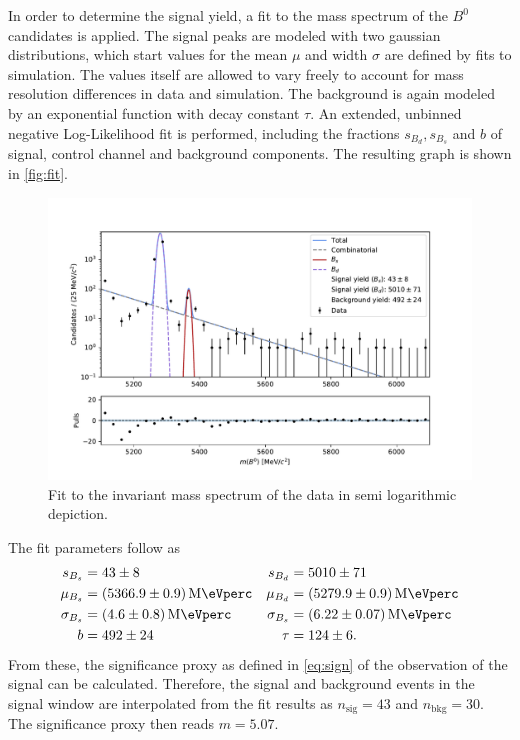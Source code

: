 In order to determine the signal yield, a fit to the mass spectrum of the $B^0$ candidates is applied. 
The signal peaks are modeled with two gaussian distributions, which start values for the mean $\mu$ and width $\sigma$ are defined by fits to simulation. The values itself 
are allowed to vary freely to account for mass resolution differences in data and simulation. 
The background is again modeled by an exponential function with decay constant $\tau$.
An extended, unbinned negative Log-Likelihood fit is performed, including the fractions $s_{B_d}, s_{B_s}$ and $b$ of signal, control channel and background components.
The resulting graph is shown in \autoref{fig:fit}.
\begin{figure}
  \centering
  \includegraphics[width = .9\textwidth]{"content/plots/final_fit.pdf"}
  \caption{Fit to the invariant mass spectrum of the data in semi logarithmic depiction.}
  \label{fig:fit}
\end{figure}
The fit parameters follow as 
\begin{align*}
  s_{B_s} &= \num{43 +- 8} & s_{B_d} &= \num{5010 +- 71} \\
  \mu_{B_s} &= \qty{5366.9 +- 0.9}{\mega\eVperc} & \mu_{B_d} &= \qty{5279.9 +- 0.9}{\mega\eVperc} \\
  \sigma_{B_s} &=  \qty{4.6 +- 0.8}{\mega\eVperc} & \sigma_{B_s} &=  \qty{6.22 +- 0.07}{\mega\eVperc} \\
  b &= \num{492 +- 24}  & \tau &= \num{124 +- 6}.
\end{align*}
From these, the significance proxy as defined in \autoref{eq:sign} of the observation of the signal can be calculated.
Therefore, the signal and background events in the signal window are interpolated from the fit results as $n_\text{sig} = \num{43}$ and $n_\text{bkg} = \num{30}$.
The significance proxy then reads $m = \num{5.07}$.
